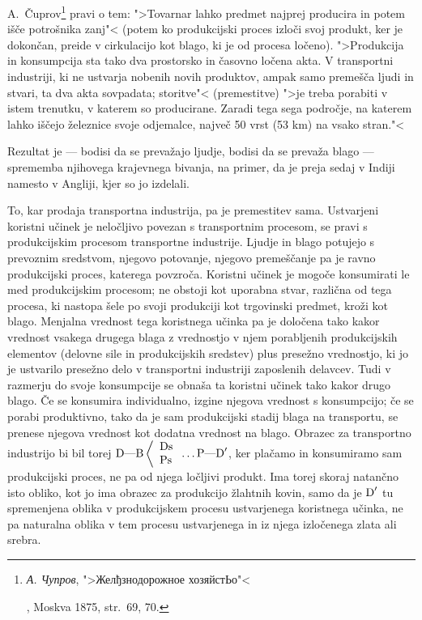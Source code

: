 \documentclass[kapital_02.tex]{subfiles}
\begin{document}
A.~Čuprov\footnote{\begin{otherlanguage}{russian}\emph{А. Чупров}, ">Желђзнодорожное хозяйстЬо"<\end{otherlanguage}, Moskva 1875, str.\ 69, 70.} pravi o tem: ">Tovarnar lahko predmet najprej producira in potem išče potrošnika zanj"< (potem ko produkcijski proces izloči svoj produkt, ker je dokončan, preide v cirkulacijo kot blago, ki je od procesa ločeno). ">Produkcija in konsumpcija sta tako dva prostorsko in časovno ločena akta. V transportni industriji, ki ne ustvarja nobenih novih produktov, ampak samo premešča ljudi in stvari, ta dva akta sovpadata; storitve"< (premestitve) ">je treba porabiti v istem trenutku, v katerem so producirane. Zaradi tega sega področje, na katerem lahko iščejo železnice svoje odjemalce, največ 50 vrst (53 km) na vsako stran."<

Rezultat je --- bodisi da se prevažajo ljudje, bodisi da se prevaža blago --- sprememba njihovega krajevnega bivanja, na primer, da je preja sedaj v Indiji namesto v Angliji, kjer so jo izdelali.

To, kar prodaja transportna industrija, pa je premestitev sama. Ustvarjeni koristni učinek je neločljivo povezan s transportnim procesom, se pravi s produkcijskim procesom transportne industrije. Ljudje in blago potujejo s prevoznim sredstvom, njegovo potovanje, njegovo premeščanje pa je ravno produkcijski proces, katerega povzroča. Koristni učinek je mogoče konsumirati le med produkcijskim procesom; ne obstoji kot uporabna stvar, različna od tega procesa, ki nastopa šele po svoji produkciji kot trgovinski predmet, kroži kot blago. Menjalna vrednost tega koristnega učinka pa je določena tako kakor vrednost vsakega drugega blaga z vrednostjo v njem porabljenih produkcijskih elementov (delovne sile in produkcijskih sredstev) plus presežno vrednostjo, ki jo je ustvarilo presežno delo v transportni industriji zaposlenih delavcev. Tudi v razmerju do svoje konsumpcije se obnaša ta koristni učinek tako kakor drugo blago. Če se konsumira individualno, izgine njegova vrednost s konsumpcijo; če se porabi produktivno, tako da je sam produkcijski stadij blaga na transportu, se prenese njegova vrednost kot dodatna vrednost na blago. Obrazec za transportno industrijo bi bil torej \( 
    \textrm{D}\textrm{---}\textrm{B}\left< 
    \begin{array}{l}
        \textrm{Ds}\\
        \textrm{Ps}\\
    \end{array}
    \right.\textrm{\dots}\textrm{P}\textrm{---}\textrm{D}'
\), ker plačamo in konsumiramo sam produkcijski proces, ne pa od njega ločljivi produkt. Ima torej skoraj natančno isto obliko, kot jo ima obrazec za produkcijo žlahtnih kovin, samo da je \( \textrm{D}' \) tu spremenjena oblika v produkcijskem procesu ustvarjenega koristnega učinka, ne pa naturalna oblika v tem procesu ustvarjenega in iz njega izločenega zlata ali srebra.
\end{document}
